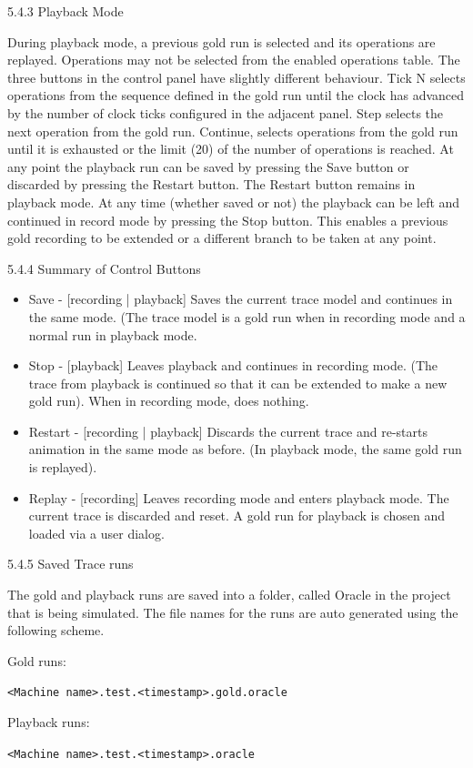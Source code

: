5.4.3	Playback Mode

During playback mode, a previous gold run is selected and its operations are replayed. Operations may not be selected from the enabled operations table. The three buttons in the control panel have slightly different behaviour. Tick N selects operations from the sequence defined in the gold run until the clock has advanced by the number of clock ticks configured in the adjacent panel. Step selects the next operation from the gold run. Continue, selects operations from the gold run until it is exhausted or the limit (20) of the number of operations is reached.
At any point the playback run can be saved by pressing the Save button or discarded by pressing the Restart button. The Restart button remains in playback mode. At any time (whether saved or not) the playback can be left and continued in record mode by pressing the Stop button. This enables a previous gold recording to be extended or a different branch to be taken at any point.

5.4.4	Summary of Control Buttons
\begin{itemize}
\item Save - [recording | playback] Saves the current trace model and continues in the same mode. (The trace model is a gold run when in recording mode and a normal run in playback mode.
\item Stop - [playback] Leaves playback and continues in recording mode. (The trace from playback is continued so that it can be extended to make a new gold run). When in recording mode, does nothing.
\item Restart - [recording | playback] Discards the current trace and re-starts animation in the same mode as before. (In playback mode, the same gold run is replayed).
\item Replay - [recording] Leaves recording mode and enters playback mode. The current trace is discarded and reset. A gold run for playback is chosen and loaded via a user dialog.
\end{itemize}

5.4.5	Saved Trace runs

The gold and playback runs are saved into a folder, called Oracle in the project that is being simulated. The file names for the runs are auto generated using the following scheme.

Gold runs:

\texttt{<Machine name>.test.<timestamp>.gold.oracle}

Playback runs:

\texttt{<Machine name>.test.<timestamp>.oracle}


